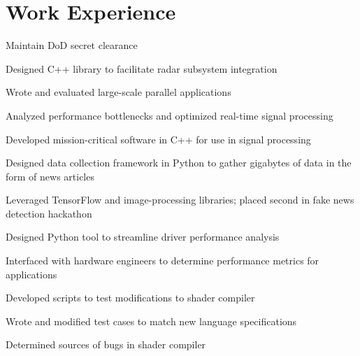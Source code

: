 \documentclass[]{deedy-resume-openfont}
\begin{document}
\vspace{-1mm}

\section{\hfill Work Experience \hfill}
\vspace{-1.35mm}
\begin{tightemize}
\vspace{\topsep} %
\item Maintain DoD secret clearance
\item Designed C++ library to facilitate radar subsystem integration
\item Wrote and evaluated large-scale parallel applications
\item Analyzed performance bottlenecks and optimized real-time signal processing
\item Developed mission-critical software in C++ for use in signal processing
\item Designed data collection framework in Python to gather gigabytes of data in the form of news articles
\item Leveraged TensorFlow and image-processing libraries; placed second in fake news detection hackathon
\end{tightemize}

\vspace{2mm}
\vspace{0.65mm}
\vspace{1.28mm}
\begin{tightemize}
\item Designed Python tool to streamline driver performance analysis
\item Interfaced with hardware engineers to determine performance metrics for applications
\item Developed scripts to test modifications to shader compiler
\item Wrote and modified test cases to match new language specifications
\item Determined sources of bugs in shader compiler
\end{tightemize}
\end{document}
